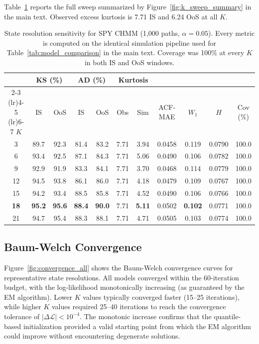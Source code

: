 Table~\ref{tab:sensitivity} reports the full sweep summarized by Figure~\ref{fig:k_sweep_summary} in the main text.
Observed excess kurtosis is 7.71 IS and 6.24 OoS at all $K$.

\begin{table}[H]
\centering
\caption{State resolution sensitivity for SPY CHMM (1{,}000 paths, $\alpha = 0.05$). Every metric is computed on the identical simulation pipeline used for Table~\ref{tab:model_comparison} in the main text. Coverage was 100\% at every $K$ in both IS and OoS windows.}
\label{tab:sensitivity}
\small
\begin{tabular}{c cc cc cc c c c c}
\toprule
& \multicolumn{2}{c}{KS (\%)} & \multicolumn{2}{c}{AD (\%)} & \multicolumn{2}{c}{Kurtosis} & & & & \\
\cmidrule(lr){2-3} \cmidrule(lr){4-5} \cmidrule(lr){6-7}
$K$ & IS & OoS & IS & OoS & Obs & Sim & ACF-MAE & $W_1$ & $H$ & Cov (\%) \\
\midrule
3  & 89.7 & 92.3 & 81.4 & 83.2 & 7.71 & 3.94 & 0.0458 & 0.119 & 0.0790 & 100.0 \\
6  & 93.4 & 92.5 & 87.1 & 84.3 & 7.71 & 5.06 & 0.0490 & 0.106 & 0.0782 & 100.0 \\
9  & 92.9 & 91.9 & 83.3 & 84.1 & 7.71 & 3.70 & 0.0468 & 0.114 & 0.0779 & 100.0 \\
12 & 94.5 & 93.8 & 86.1 & 86.0 & 7.71 & 4.18 & 0.0479 & 0.109 & 0.0767 & 100.0 \\
15 & 94.2 & 93.4 & 88.5 & 85.8 & 7.71 & 4.52 & 0.0490 & 0.106 & 0.0766 & 100.0 \\
\textbf{18} & \textbf{95.2} & \textbf{95.6} & \textbf{88.4} & \textbf{90.0} & 7.71 & \textbf{5.11} & 0.0502 & \textbf{0.102} & 0.0771 & 100.0 \\
21 & 94.7 & 95.4 & 88.3 & 88.1 & 7.71 & 4.71 & 0.0505 & 0.103 & 0.0774 & 100.0 \\
\bottomrule
\end{tabular}
\end{table}

\subsection{Baum-Welch Convergence}
\label{sec:convergence}

Figure~\ref{fig:convergence_all} shows the Baum-Welch convergence curves for representative state resolutions.
All models converged within the 60-iteration budget, with the log-likelihood monotonically increasing (as guaranteed by the EM algorithm).
Lower $K$ values typically converged faster (15--25 iterations), while higher $K$ values required 25--40 iterations to reach the convergence tolerance of $|\Delta\mathcal{L}| < 10^{-4}$.
The monotonic increase confirms that the quantile-based initialization provided a valid starting point from which the EM algorithm could improve without encountering degenerate solutions.

